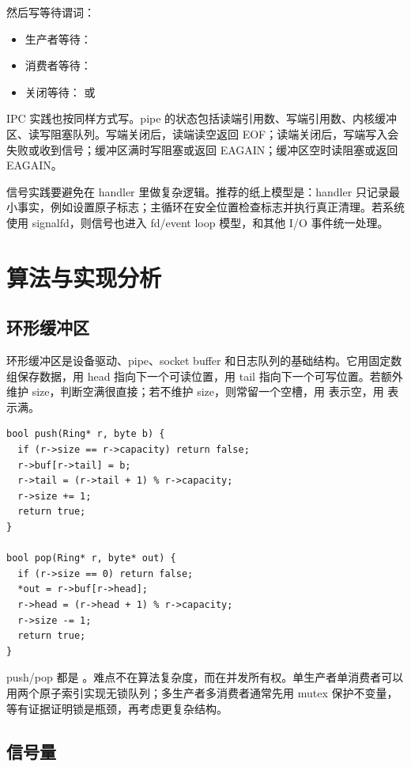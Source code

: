 然后写等待谓词：

\begin{itemize}
\tightlist
\item 生产者等待：
\item 消费者等待：
\item 关闭等待： 或 
\end{itemize}

IPC 实践也按同样方式写。pipe 的状态包括读端引用数、写端引用数、内核缓冲区、读写阻塞队列。写端关闭后，读端读空返回 EOF；读端关闭后，写端写入会失败或收到信号；缓冲区满时写阻塞或返回 EAGAIN；缓冲区空时读阻塞或返回 EAGAIN。

信号实践要避免在 handler 里做复杂逻辑。推荐的纸上模型是：handler 只记录最小事实，例如设置原子标志；主循环在安全位置检查标志并执行真正清理。若系统使用 signalfd，则信号也进入 fd/event loop 模型，和其他 I/O 事件统一处理。

\section{算法与实现分析}

\subsection{环形缓冲区}

环形缓冲区是设备驱动、pipe、socket buffer 和日志队列的基础结构。它用固定数组保存数据，用 head 指向下一个可读位置，用 tail 指向下一个可写位置。若额外维护 size，判断空满很直接；若不维护 size，则常留一个空槽，用  表示空，用  表示满。

\begin{lstlisting}
bool push(Ring* r, byte b) {
  if (r->size == r->capacity) return false;
  r->buf[r->tail] = b;
  r->tail = (r->tail + 1) % r->capacity;
  r->size += 1;
  return true;
}

bool pop(Ring* r, byte* out) {
  if (r->size == 0) return false;
  *out = r->buf[r->head];
  r->head = (r->head + 1) % r->capacity;
  r->size -= 1;
  return true;
}
\end{lstlisting}

push/pop 都是 。难点不在算法复杂度，而在并发所有权。单生产者单消费者可以用两个原子索引实现无锁队列；多生产者多消费者通常先用 mutex 保护不变量，等有证据证明锁是瓶颈，再考虑更复杂结构。

\subsection{信号量}

